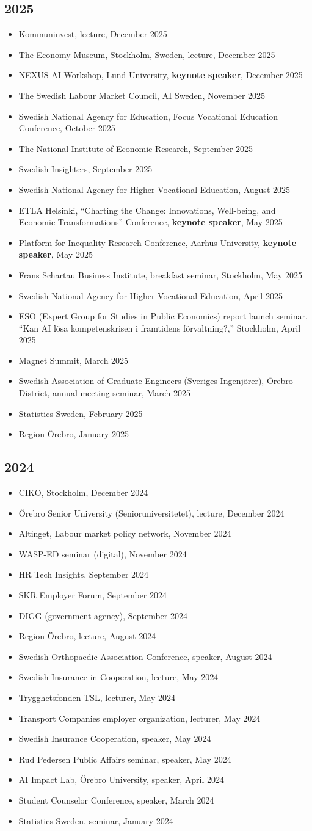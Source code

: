 \documentclass[11pt,a4paper]{article}
\newcommand{\cventry}[1]{\item #1}
\begin{document}
\subsection{2025}
\begin{itemize}
  \cventry{Kommuninvest, lecture, December 2025}
  \cventry{The Economy Museum, Stockholm, Sweden, lecture, December 2025}
  \cventry{NEXUS AI Workshop, Lund University, \textbf{keynote speaker}, December 2025}
  \cventry{The Swedish Labour Market Council, AI Sweden, November 2025}
  \cventry{Swedish National Agency for Education, Focus Vocational Education Conference, October 2025}
  \cventry{The National Institute of Economic Research, September 2025}
  \cventry{Swedish Insighters, September 2025}
  \cventry{Swedish National Agency for Higher Vocational Education, August 2025}
  \cventry{ETLA Helsinki, ``Charting the Change: Innovations, Well-being, and Economic Transformations'' Conference, \textbf{keynote speaker}, May 2025}
  \cventry{Platform for Inequality Research Conference, Aarhus University, \textbf{keynote speaker}, May 2025}
  \cventry{Frans Schartau Business Institute, breakfast seminar, Stockholm, May 2025}
  \cventry{Swedish National Agency for Higher Vocational Education, April 2025}
  \cventry{ESO (Expert Group for Studies in Public Economics) report launch seminar, ``Kan AI lösa kompetenskrisen i framtidens förvaltning?,'' Stockholm, April 2025}
  \cventry{Magnet Summit, March 2025}
  \cventry{Swedish Association of Graduate Engineers (Sveriges Ingenjörer), Örebro District, annual meeting seminar, March 2025}
  \cventry{Statistics Sweden, February 2025}
  \cventry{Region Örebro, January 2025}
\end{itemize}

\subsection{2024}
\begin{itemize}
  \cventry{CIKO, Stockholm, December 2024}
  \cventry{Örebro Senior University (Senioruniversitetet), lecture, December 2024}
  \cventry{Altinget, Labour market policy network, November 2024}
  \cventry{WASP-ED seminar (digital), November 2024}
  \cventry{HR Tech Insights, September 2024}
  \cventry{SKR Employer Forum, September 2024}
  \cventry{DIGG (government agency), September 2024}
  \cventry{Region Örebro, lecture, August 2024}
  \cventry{Swedish Orthopaedic Association Conference, speaker, August 2024}
  \cventry{Swedish Insurance in Cooperation, lecture, May 2024}
  \cventry{Trygghetsfonden TSL, lecturer, May 2024}
  \cventry{Transport Companies employer organization, lecturer, May 2024}
  \cventry{Swedish Insurance Cooperation, speaker, May 2024}
  \cventry{Rud Pedersen Public Affairs seminar, speaker, May 2024}
  \cventry{AI Impact Lab, Örebro University, speaker, April 2024}
  \cventry{Student Counselor Conference, speaker, March 2024}
  \cventry{Statistics Sweden, seminar, January 2024}
\end{itemize}
\end{document}
